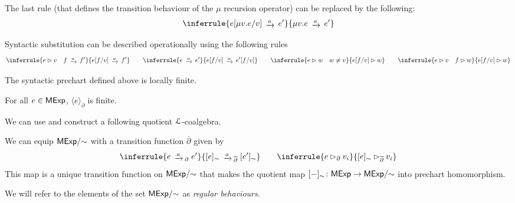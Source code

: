 \begin{remark}
	The last rule (that defines the transition behaviour of the $\mu$ recursion operator) can be replaced by the following:
	\begin{gather*}
		\inferrule{e[\mu v. e / v] \tr{a} e'}{\mu v. e \tr{a} e'}
	\end{gather*}
\end{remark}

\begin{remark}\label{rem:semantic-substitution}
	Syntactic substitution can be described operationally using the following rules
	\begin{gather*}
		\inferrule{e \rhd v\quad f\tr{a} f'}{e[f / v] \tr{a} f'}\qquad \inferrule{e \tr{a} e'}{e[f / v] \tr{a} e'[f/v]}\qquad \inferrule{e \rhd w \quad w \neq v }{e[f/v] \rhd w} \qquad \inferrule{e \rhd v \quad f \rhd w}{e[f/v] \rhd w}
	\end{gather*}
\end{remark}
The syntactic prechart defined above is locally finite.
\begin{lemma}
	For all $e \in \mathsf{MExp}$, $\langle e \rangle_\partial$ is finite.
\end{lemma}
We can use  and construct a following quotient $\mathcal{L}$-coalgebra.
\begin{lemma}\label{lem:quotient_chart}	
	We can equip ${\mathsf{MExp}}/{\sim}$ with a transition function $\overline\partial$ given by
	$$
	\inferrule{e \tr{a}_\partial e'}{[e]_\sim \tr{a}_{\overline\partial} [e']_\sim} \qquad \inferrule{e \rhd_{\partial} v_i}{[e]_\sim \rhd_{\overline{\partial}} v_i}
	$$
	This map is a unique transition function on ${\mathsf{MExp}}/{\sim}$ that makes the quotient map $[-]_{\sim} \colon \mathsf{MExp} \to {\mathsf{MExp}}/{\sim}$ into prechart homomorphism.
\end{lemma}
We will refer to the elements of the set $\mathsf{MExp}/{\sim}$ as \emph{regular behaviours}.

